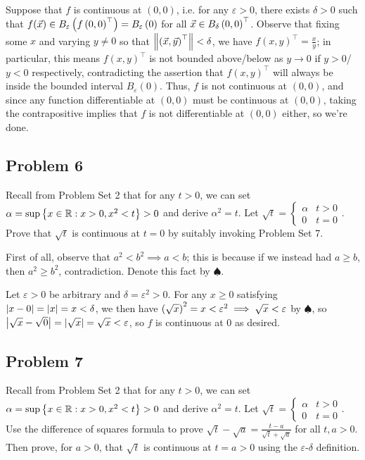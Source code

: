 \documentclass[main.tex]{subfiles}
\begin{document}
\begin{soln}
    Suppose that $f$ is continuous at $(0, 0)$, i.e. for any $\varepsilon > 0$, there exists $\delta > 0$ such that $f(\vec{x})\in B_\varepsilon\left( f\left( 0, 0 \right)^\top \right) = B_\varepsilon\left( 0 \right)$ for all $\vec{x}\in B_\delta\left( 0, 0 \right)^\top$. Observe that fixing some $x$ and varying $y\neq 0$ so that $\left\lVert \left( \vec{x}, \vec{y} \right)^\top \right\rVert < \delta$, we have $f(x, y)^\top = \frac{x}{y}$; in particular, this means $f(x, y)^\top$ is not bounded above/below as $y\to 0$ if $y > 0$/$y < 0$ respectively, contradicting the assertion that $f(x, y)^\top$ will always be inside the bounded interval $B_\varepsilon(0)$. Thus, $f$ is not continuous at $(0, 0)$, and since any function differentiable at $(0, 0)$ must be continuous at $(0, 0)$, taking the contrapositive implies that $f$ is not differentiable at $(0, 0)$ either, so we're done.
\end{soln}
\eject

\subsection{Problem 6}
\begin{claim}
    Recall from Problem Set 2 that for any $t > 0$, we can set $\alpha = \sup\left\{ x \in \mathbb R : x > 0, x^2 < t \right\}> 0$ and derive $\alpha^2 = t$. Let $\sqrt{t} = \begin{cases} \alpha & t > 0 \\
    0 & t = 0\end{cases}$. Prove that $\sqrt{t}$ is continuous at $t = 0$ by suitably invoking Problem Set 7.
\end{claim}

\begin{soln}
    First of all, observe that $a^2 < b^2 \implies a < b$; this is because if we instead had $a \ge b$, then $a^2 \ge b^2$, contradiction. Denote this fact by $\spadesuit$.
    
    Let $\varepsilon > 0$ be arbitrary and $\delta = \varepsilon^2 > 0$. For any $x \ge 0$ satisfying $\left\lvert x - 0 \right\rvert = \left\lvert x \right\rvert = x < \delta$, we then have $\left( \sqrt{x} \right)^2 = x < \varepsilon^2 \implies \sqrt{x} < \varepsilon$ by $\spadesuit$, so $\left\lvert \sqrt{x} - \sqrt{0} \right\rvert = \left\lvert \sqrt{x} \right\rvert = \sqrt{x} < \varepsilon$, so $f$ is continuous at $0$ as desired.
\end{soln}
\eject

\subsection{Problem 7}
\begin{claim}
    Recall from Problem Set 2 that for any $t > 0$, we can set $\alpha = \sup\left\{ x \in \mathbb R : x > 0, x^2 < t \right\}> 0$ and derive $\alpha^2 = t$. Let $\sqrt{t} = \begin{cases} \alpha & t > 0 \\
    0 & t = 0\end{cases}$. Use the difference of squares formula to prove $\sqrt{t}-\sqrt{a} = \frac{t-a}{\sqrt{t}+\sqrt{a}}$ for all $t,a > 0$. Then prove, for $a > 0$, that $\sqrt{t}$ is continuous at $t = a > 0$ using the $\varepsilon$-$\delta$ definition.
\end{claim}
\end{document}
